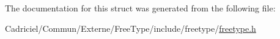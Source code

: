 The documentation for this struct was generated from the following file\-:\begin{DoxyCompactItemize}
\item 
Cadriciel/\-Commun/\-Externe/\-Free\-Type/include/freetype/\hyperlink{freetype_8h}{freetype.\-h}\end{DoxyCompactItemize}
